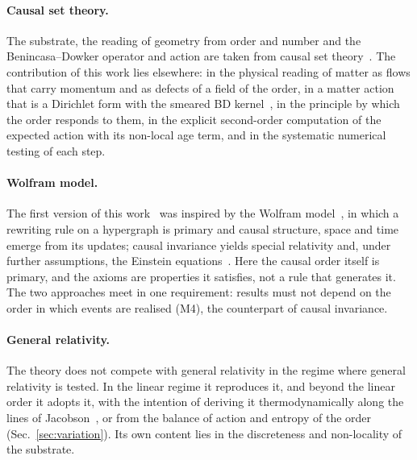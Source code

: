 \paragraph{Causal set theory.} The substrate, the reading of geometry from order and number and the
Benincasa--Dowker operator and action are taken from causal set
theory~\cite{Bombelli1987,Surya2019,BenincasaDowker2010,Sorkin2007,DowkerGlaser2013}. The
contribution of this work lies elsewhere: in the physical reading of matter as flows that carry
momentum and as defects of a field of the order, in a matter action that is a Dirichlet form with the smeared BD
kernel~\cite{BenincasaDowker2010}, in the principle by which the order responds to them, in the explicit second-order
computation of the expected action with its non-local age term, and in the systematic numerical
testing of each step.

\paragraph{Wolfram model.} The first version of this work~\cite{Sikula2026v1} was inspired by the Wolfram
model~\cite{Wolfram2020}, in which a rewriting rule on a hypergraph is primary and causal structure, space and
time emerge from its updates; causal invariance yields special relativity and, under further assumptions, the
Einstein equations~\cite{Gorard2020}. Here the causal order itself is primary, and the axioms are properties it
satisfies, not a rule that generates it. The two approaches meet in one requirement: results must not depend on
the order in which events are realised (M4), the counterpart of causal invariance.

\paragraph{General relativity.} The theory does not compete with general relativity in the regime
where general relativity is tested. In the linear regime it reproduces it, and beyond the linear
order it adopts it, with the intention of deriving it thermodynamically along the lines of
Jacobson~\cite{Jacobson1995}, or from the balance of action and entropy of the order (Sec.~\ref{sec:variation}).
Its own content lies in the discreteness and non-locality of the
substrate.

